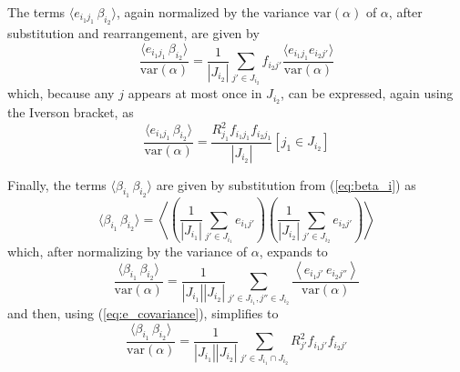 \documentclass[11pt,a4paper]{article}
\begin{document}
The terms $\langle e_{i_1 j_1}\, \beta_{i_2}\rangle$, again normalized
by the variance $\text{var}(\alpha)$ of $\alpha$, after substitution
and rearrangement, are given by
\begin{equation}
  \frac{\langle e_{i_1 j_1}\, \beta_{i_2}\rangle}{\text{var}(\alpha)} = \frac{1}{|J_{i_2}|}\sum_{j' \in J_{i_2}} f_{i_2 j'} \frac{\langle e_{i_1 j_1} e_{i_2 j'} \rangle}{\text{var}(\alpha)}
\end{equation}
which, because any $j$ appears at most once in $J_{i_2}$, can be
expressed, again using the Iverson bracket, as
\begin{equation}
  \label{eq:e_beta_covariance}
  \frac{\langle e_{i_1 j_1}\, \beta_{i_2}\rangle}{\text{var}(\alpha)} = \frac{R_{j_1}^2 f_{i_1 j_1} f_{i_2 j_1}}{|J_{i_2}|} [j_1 \in J_{i_2}]
\end{equation}

Finally, the terms $\langle\beta_{i_1}\,\beta_{i_2}\rangle$ are given by
substitution from (\ref{eq:beta_i}) as
\begin{equation}
  \langle\beta_{i_1}\,\beta_{i_2}\rangle =
  \left\langle
  \left(\frac{1}{|J_{i_1}|}\sum_{j' \in J_{i_1}} e_{i_1 j'}\right)
  \left(\frac{1}{|J_{i_2}|}\sum_{j' \in J_{i_2}} e_{i_2 j'}\right)
  \right\rangle
\end{equation}
which, after normalizing by the variance of $\alpha$, expands to
\begin{equation}
  \frac{\langle\beta_{i_1}\,\beta_{i_2}\rangle}{\text{var}(\alpha)} =
  \frac{1}{|J_{i_1}| |J_{i_2}|}
    \sum_{j' \in J_{i_1}, j'' \in J_{i_2}} \frac{\left\langle e_{i_1 j'}\, e_{i_2 j''} \right\rangle}{\text{var}(\alpha)}
\end{equation}
and then, using (\ref{eq:e_covariance}), simplifies to
\begin{equation}
  \label{eq:beta_covariance}
  \frac{\langle\beta_{i_1}\,\beta_{i_2}\rangle}{\text{var}(\alpha)} =
  \frac{1}{|J_{i_1}| |J_{i_2}|} \sum_{j' \in J_{i_1}\cap J_{i_2}} R_{j'}^2 f_{i_1 j'} f_{i_2 j'}
\end{equation}
\end{document}
